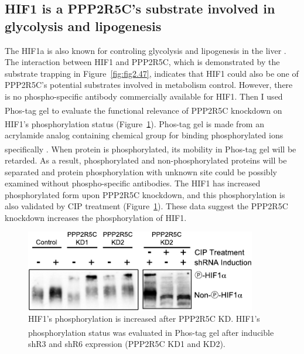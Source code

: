 \subsection{HIF1\texorpdfstring{\textalpha}{a}{} is a PPP2R5C's substrate involved in glycolysis and lipogenesis}

The \gls{HIF1a} is also known for controling glycolysis and lipogenesis in the liver \cite{ochiai_disruption_2011,nath_hepatocyte-specific_2011,li_altered_2006,li_intermittent_2005, wang_ablation_2009}. The interaction between HIF1\textalpha{} and PPP2R5C, which is demonstrated by the substrate trapping in Figure~\ref{fig:fig2.47}, indicates that HIF1\textalpha{} could also be one of PPP2R5C's potential substrates involved in metabolism control. However, there is no phospho-specific antibody commercially available for HIF1\textalpha{}. Then I used Phos-tag\textsuperscript{\textregistered} gel to evaluate the functional relevance of PPP2R5C knockdown on HIF1\textalpha{}'s phosphorylation status (Figure~\ref{fig:fig2.51}). Phos-tag\textsuperscript{\textregistered} gel is made from an acrylamide analog containing chemical group for binding phosphorylated ions specifically \cite{tomida_detection_2008,kinoshita_improved_2011,marelli-berg_molecular_2012,hosokawa_quantitative_2010,kinoshita_separation_2009}. When protein is phosphorylated, its mobility in Phos-tag\textsuperscript{\textregistered} gel will be retarded. As a result, phosphorylated and non-phosphorylated proteins will be separated and protein phosphorylation with unknown site could be possibly examined without phospho-specific antibodies. The HIF1\textalpha{} has increased phosphorylated form upon PPP2R5C knockdown, and this phosphorylation is also validated by CIP treatment (Figure~\ref{fig:fig2.51}). These data suggest the PPP2R5C knockdown increases the phosphorylation of HIF1\textalpha{}.

\begin{figure}[htbp]
\centering
\includegraphics[width=0.9\textwidth]{figs/fig2-51 hif phospho.pdf}
\caption[HIF1\textalpha's phosphorylation analysis by Phos-tag\textsuperscript{\textregistered}]{\footnotesize HIF1\textalpha{}'s phosphorylation is increased after PPP2R5C KD. HIF1\textalpha{}'s phosphorylation status was evaluated in Phos-tag\textsuperscript{\textregistered} gel after inducible shR3 and shR6 expression (PPP2R5C KD1 and KD2).}
\label{fig:fig2.51}
\end{figure}

